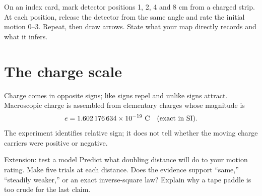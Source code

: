 On an index card, mark detector positions 1, 2, 4 and 8 cm from a charged strip.
At each position, release the detector from the same angle and rate the initial
motion 0--3. Repeat, then draw arrows. State what your map directly records and
what it infers.

\begin{labrecord}\end{labrecord}

\section{The charge scale}
Charge comes in opposite signs; like signs repel and unlike signs attract.
Macroscopic charge is assembled from elementary charges whose magnitude is
\[
e=1.602\,176\,634\times10^{-19}\ {\rm C}\quad\hbox{(exact in SI).}
\]
The experiment identifies relative sign; it does not tell whether the moving
charge carriers were positive or negative.

\begin{teloscard}{Extension: test a model}
Predict what doubling distance will do to your motion rating. Make five trials
at each distance. Does the evidence support “same,” “steadily weaker,” or an
exact inverse-square law? Explain why a tape paddle is too crude for the last
claim.
\end{teloscard}


